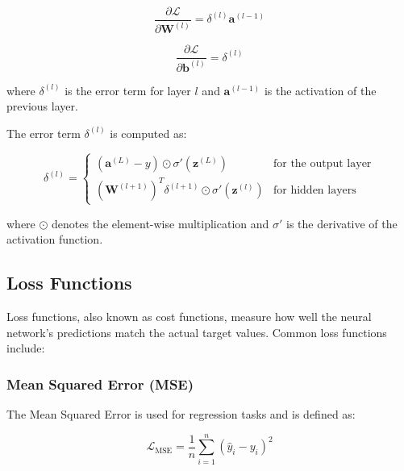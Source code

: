 \documentclass{report}
\begin{document}
            \begin{equation}
            \frac{\partial \mathcal{L}}{\partial \mathbf{W}^{(l)}} = \delta^{(l)} \mathbf{a}^{(l-1)} 
            \end{equation}
            
            \begin{equation}
            \frac{\partial \mathcal{L}}{\partial \mathbf{b}^{(l)}} = \delta^{(l)}
            \end{equation}
            
            where \( \delta^{(l)} \) is the error term for layer \( l \) and \( \mathbf{a}^{(l-1)} \) is the activation of the previous layer.
            
            The error term \( \delta^{(l)} \) is computed as:
            
            \begin{equation}
            \delta^{(l)} = \begin{cases} 
            (\mathbf{a}^{(L)} - y) \odot \sigma'(\mathbf{z}^{(L)}) & \text{for the output layer} \\
            (\mathbf{W}^{(l+1)})^T \delta^{(l+1)} \odot \sigma'(\mathbf{z}^{(l)}) & \text{for hidden layers}
            \end{cases}
            \end{equation}
            
            where \( \odot \) denotes the element-wise multiplication and \( \sigma' \) is the derivative of the activation function.
            
            \subsection{Loss Functions}
            
            Loss functions, also known as cost functions, measure how well the neural network's predictions match the actual target values. Common loss functions include:
            
            \subsubsection{Mean Squared Error (MSE)}
            
            The Mean Squared Error is used for regression tasks and is defined as:
            
            \begin{equation}
            \mathcal{L}_{\text{MSE}} = \frac{1}{n} \sum_{i=1}^n (\hat{y}_i - y_i)^2
            \end{equation}
            
\end{document}
